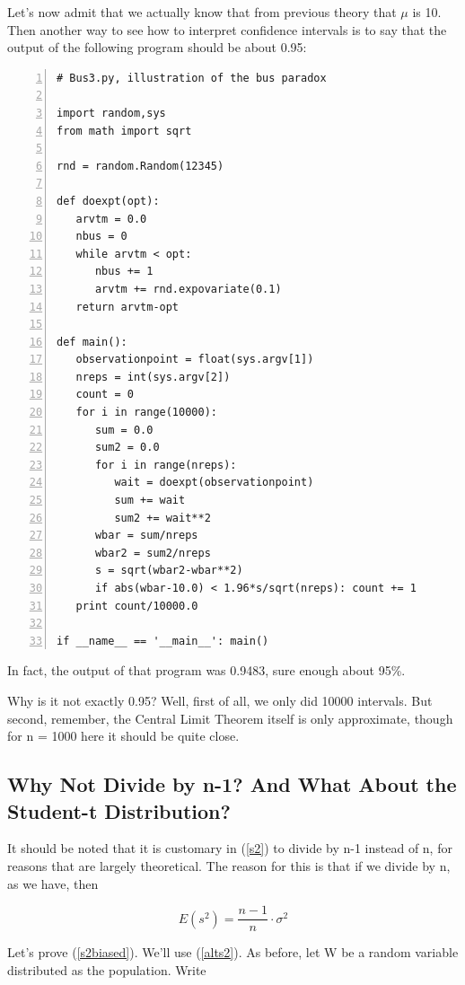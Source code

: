 Let's now admit that we actually know that from previous theory that $\mu$
is 10.  Then another way to see how to interpret confidence intervals is
to say that the output of the following program should be about 0.95:

\begin{Verbatim}[fontsize=\relsize{-2},numbers=left]
# Bus3.py, illustration of the bus paradox

import random,sys
from math import sqrt

rnd = random.Random(12345)

def doexpt(opt):
   arvtm = 0.0
   nbus = 0
   while arvtm < opt:
      nbus += 1
      arvtm += rnd.expovariate(0.1)
   return arvtm-opt

def main():
   observationpoint = float(sys.argv[1])
   nreps = int(sys.argv[2])
   count = 0
   for i in range(10000):
      sum = 0.0
      sum2 = 0.0
      for i in range(nreps):
         wait = doexpt(observationpoint)
         sum += wait
         sum2 += wait**2
      wbar = sum/nreps
      wbar2 = sum2/nreps
      s = sqrt(wbar2-wbar**2)
      if abs(wbar-10.0) < 1.96*s/sqrt(nreps): count += 1
   print count/10000.0

if __name__ == '__main__': main()
\end{Verbatim}

In fact, the output of that program was 0.9483, sure enough about
95\%.

\checkpoint

Why is it not exactly 0.95?  Well, first of all, we only did 10000
intervals.  But second, remember, the Central Limit Theorem itself is
only approximate, though for n = 1000 here it should be quite close.

\subsection{Why Not Divide by n-1?  And What About the Student-t
Distribution?}

It should be noted that it is customary in (\ref{s2}) to divide by n-1
instead of n, for reasons that are largely theoretical.  The reason for
this is that if we divide by n, as we have, then

\begin{equation}
\label{s2biased}
E(s^2) = \frac{n-1}{n} \cdot \sigma^2
\end{equation}

Let's prove (\ref{s2biased}).  We'll use (\ref{alts2}).  As before, let W
be a random variable distributed as the population.  Write

